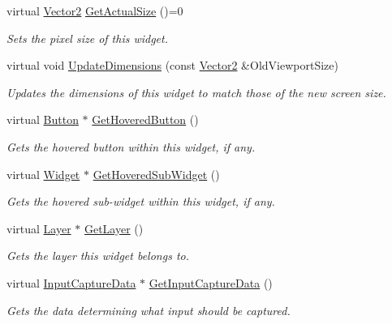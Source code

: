 \begin{DoxyCompactItemize}
virtual \hyperlink{classphys_1_1Vector2}{Vector2} \hyperlink{classphys_1_1UI_1_1Widget_af3a685621ed220748c0940ea38c96ed2}{GetActualSize} ()=0
\begin{DoxyCompactList}\small\item\em Sets the pixel size of this widget. \item\end{DoxyCompactList}\item 
virtual void \hyperlink{classphys_1_1UI_1_1Widget_acbda7003549c6caac46078c034657929}{UpdateDimensions} (const \hyperlink{classphys_1_1Vector2}{Vector2} \&OldViewportSize)
\begin{DoxyCompactList}\small\item\em Updates the dimensions of this widget to match those of the new screen size. \item\end{DoxyCompactList}\item 
virtual \hyperlink{classphys_1_1UI_1_1Button}{Button} $\ast$ \hyperlink{classphys_1_1UI_1_1Widget_ab563c13db418e4c3ff0a0dd766550251}{GetHoveredButton} ()
\begin{DoxyCompactList}\small\item\em Gets the hovered button within this widget, if any. \item\end{DoxyCompactList}\item 
virtual \hyperlink{classphys_1_1UI_1_1Widget}{Widget} $\ast$ \hyperlink{classphys_1_1UI_1_1Widget_a38764b73bc6087e2611660735840ba3f}{GetHoveredSubWidget} ()
\begin{DoxyCompactList}\small\item\em Gets the hovered sub-\/widget within this widget, if any. \item\end{DoxyCompactList}\item 
virtual \hyperlink{classphys_1_1UI_1_1Layer}{Layer} $\ast$ \hyperlink{classphys_1_1UI_1_1Widget_a33f97d7da0ac48a35006cb71676e6c2e}{GetLayer} ()
\begin{DoxyCompactList}\small\item\em Gets the layer this widget belongs to. \item\end{DoxyCompactList}\item 
virtual \hyperlink{classphys_1_1UI_1_1InputCaptureData}{InputCaptureData} $\ast$ \hyperlink{classphys_1_1UI_1_1Widget_a900184fbe7af51581d6bddafb45d953a}{GetInputCaptureData} ()
\begin{DoxyCompactList}\small\item\em Gets the data determining what input should be captured. \item\end{DoxyCompactList}\end{DoxyCompactItemize}
